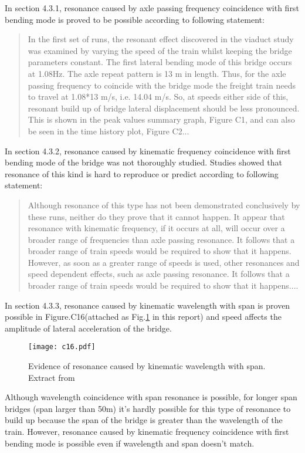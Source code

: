 In section 4.3.1, resonance caused by axle passing frequency coincidence with first bending mode is proved to be possible according to following statement:
\begin{quote}
    In the first set of runs, the resonant effect discovered in the viaduct study was examined by varying the speed of the train whilst keeping the bridge parameters constant. The first lateral bending mode of this bridge occurs at 1.08Hz. The axle repeat pattern is 13 m in length. Thus, for the axle passing frequency to coincide with the bridge mode the freight train needs to travel at 1.08*13 m/s, i.e. 14.04 m/s. So, at speeds either side of this, resonant build up of bridge lateral displacement should be less pronounced. This is shown in the peak values summary graph, Figure C1, and can also be seen in the time history plot, Figure C2...
\end{quote}

In section 4.3.2, resonance caused by kinematic frequency coincidence with first bending mode of the bridge was not thoroughly studied. Studies showed that resonance of this kind is hard to reproduce or predict according to following statement:
\begin{quote}
    Although resonance of this type has not been demonstrated conclusively by these runs, neither do they prove that it cannot happen. It appear that resonance with kinematic frequency, if it occurs at all, will occur over a broader range of frequencies than axle passing resonance. It follows that a broader range of train speeds would be required to show that it happens. However, as soon as a greater range of speeds is used, other resonances and speed dependent effects, such as axle passing resonance. It follows that a broader range of train speeds would be required to show that it happens....
\end{quote}

In section 4.3.3, resonance caused by kinematic wavelength with span is proven possible in Figure.C16(attached as Fig.\ref{fig:c16} in this report) and speed affects the amplitude of lateral acceleration of the bridge.

\begin{figure}[h]
    \centering
    \texttt{[image: c16.pdf]}
    \caption{Evidence of resonance caused by kinematic wavelength with span. Extract from \cite[C16]{d181dt329} }
    \label{fig:c16}
\end{figure}

Although wavelength coincidence with span resonance is possible, for longer span bridges (span larger than 50m) it's hardly possible for this type of resonance to build up because the span of the bridge is greater than the wavelength of the train. However, resonance caused by kinematic frequency coincidence with first bending mode is possible even if wavelength and span doesn't match.

